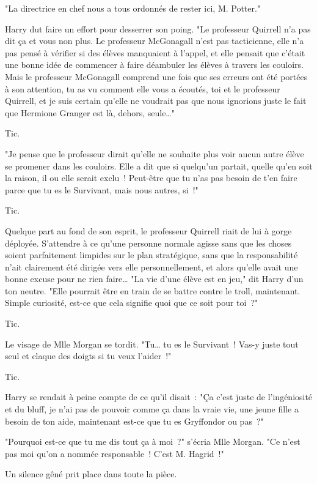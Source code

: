 "La directrice en chef nous a tous ordonnés de rester ici, M. Potter."

Harry dut faire un effort pour desserrer son poing. "Le professeur Quirrell n'a pas dit ça et vous non plus. Le professeur McGonagall n'est pas tacticienne, elle n'a pas pensé à vérifier si des élèves manquaient à l'appel, et elle pensait que c'était une bonne idée de commencer à faire déambuler les élèves à travers les couloirs. Mais le professeur McGonagall comprend une fois que ses erreurs ont été portées à son attention, tu as vu comment elle vous a écoutés, toi et le professeur Quirrell, et je suis certain qu'elle ne voudrait pas que nous ignorions juste le fait que Hermione Granger est là, dehors, seule…"

Tic.

"Je pense que le professeur dirait qu'elle ne souhaite plus voir aucun autre élève se promener dans les couloirs. Elle a dit que si quelqu'un partait, quelle qu'en soit la raison, il ou elle serait exclu~! Peut-être que tu n'as pas besoin de t'en faire parce que tu es le Survivant, mais nous autres, si~!"

Tic.

Quelque part au fond de son esprit, le professeur Quirrell riait de lui à gorge déployée. S'attendre à ce qu'une personne normale agisse sans que les choses soient parfaitement limpides sur le plan stratégique, sans que la responsabilité n'ait clairement été dirigée vers elle personnellement, et alors qu'elle avait une bonne excuse pour ne rien faire… "La vie d'une élève est en jeu," dit Harry d'un ton neutre. "Elle pourrait être en train de se battre contre le troll, maintenant. Simple curiosité, est-ce que cela signifie quoi que ce soit pour toi~?"

Tic.

Le visage de Mlle Morgan se tordit. "Tu… tu es le Survivant~! Vas-y juste tout seul et claque des doigts si tu veux l'aider~!"

Tic.

Harry se rendait à peine compte de ce qu'il disait~: "Ça c'est juste de l'ingéniosité et du bluff, je n'ai pas de pouvoir comme ça dans la vraie vie, une jeune fille a besoin de ton aide, maintenant est-ce que tu es Gryffondor ou pas~?"

"Pourquoi est-ce que tu me dis tout ça à moi~?" s'écria Mlle Morgan. "Ce n'est pas moi qu'on a nommée responsable~! C'est M. Hagrid~!"

Un silence gêné prit place dans toute la pièce.

